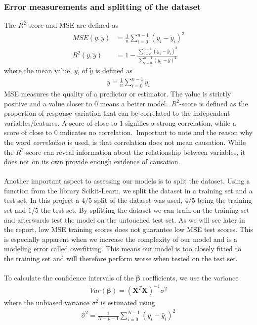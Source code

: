 \documentclass[a4paper,twocolumn]{article}
\newcommand{\X}{\mathbf{X}}
\newcommand{\B}{\boldsymbol{\beta}}
\begin{document}
\subsubsection{Error measurements and splitting of the dataset}
The $R^{2}$-score and MSE are defined as
\begin{align}
        MSE(y, \widetilde{y}) &= \frac{1}{n}\sum_{i=0}^{n-1}(y_{i} - \widetilde{y}_{i})^{2}\\
        R^{2}(y,\widetilde{y}) &= 1 - \frac{\sum_{i=0}^{n-1}(y_{1} - \widetilde{y_{i}})^{2}}{\sum_{i=0}^{n-1}(y_{1} - \overline{y})^{2}}
\end{align}
where the mean value, $\overline{y}$, of $\widetilde{y}$ is defined as
\begin{align}
    \overline{y} = \frac{1}{n}\sum_{i=0}^{n-1}y_{i}
\end{align}
MSE measures the quality of a predictor or estimator. The value is strictly positive and a value closer to 0 means a better model.\ $R^{2}$-score is defined as the proportion of response variation that can be correlated to the independent variables/features. A score of close to 1 signifies a strong correlation, while a score of close to 0 indicates no correlation.\ Important to note and the reason why the word \textit{correlation} is used, is that correlation does not mean causation. While the $R^{2}$-score can reveal information about the relationship between variables, it does not on its own provide enough evidence of causation.\\
\\
Another important aspect to assessing our models is to split the dataset. Using a function from the library Scikit-Learn, we split the dataset in a training set and a test set. In this project a $4/5$ split of the dataset was used, $4/5$ being the training set and $1/5$ the test set. By splitting the dataset we can train on the training set and afterwards test the model on the untouched test set. As we will see later in the report, low MSE training scores does not guarantee low MSE test scores. This is especially apparent when we increase the complexity of our model and is a modeling error called overfitting. This means our model is too closely fitted to the training set and will therefore perform worse when tested on the test set.\\
\\
To calculate the confidence intervals of the $\B$ coefficients, we use the variance \cite{ridge2} 
\begin{align*}
    Var(\B) = (\X^{T}\X)^{-1}\sigma^{2}
\end{align*}
where the unbiased variance $\sigma^{2}$ is estimated using
\begin{align*}
    \hat{\sigma}^{2} = \frac{1}{N-p-1}\sum_{i=0}^{N-1}(y_{i}-\hat{y}_{i})^{2}
\end{align*}
\end{document}
